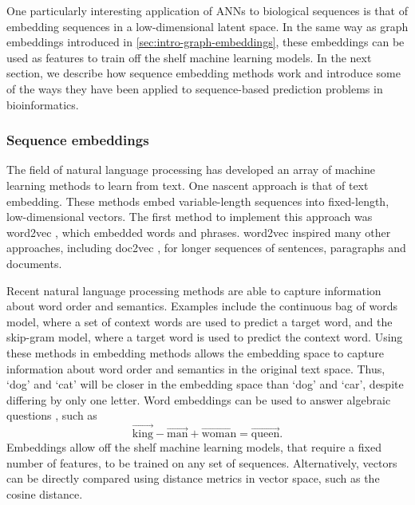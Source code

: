 One particularly interesting application of ANNs to biological sequences is that of embedding sequences in a low-dimensional latent space. In the same way as graph embeddings introduced in \ref{sec:intro-graph-embeddings}, these embeddings can be used as features to train off the shelf machine learning models. In the next section, we describe how sequence embedding methods work and introduce some of the ways they have been applied to sequence-based prediction problems in bioinformatics.

\subsubsection{Sequence embeddings}
\label{sec:intro-sequence-embeddings}

The field of natural language processing has developed an array of machine learning methods to learn from text. One nascent approach is that of text embedding. These methods embed variable-length sequences into fixed-length, low-dimensional vectors. The first method to implement this approach was word2vec \cite{Mikolov}, which embedded words and phrases. word2vec inspired many other approaches, including doc2vec \cite{Le2014}, for longer sequences of sentences, paragraphs and documents.

Recent natural language processing methods are able to capture information about word order and semantics. Examples include the continuous bag of words model, where a set of context words are used to predict a target word, and the skip-gram model, where a target word is used to predict the context word. Using these methods in embedding methods allows the embedding space to capture information about word order and semantics in the original text space. Thus, `dog' and `cat' will be closer in the embedding space than `dog' and `car', despite differing by only one letter. Word embeddings can be used to answer algebraic questions \cite{Le2014}, such as
\[
\overrightarrow{\text{king}} - \overrightarrow{\text{man}} + \overrightarrow{\text{woman}} = \overrightarrow{\text{queen}}.
\]
Embeddings allow off the shelf machine learning models, that require a fixed number of features, to be trained on any set of sequences. Alternatively, vectors can be directly compared using distance metrics in vector space, such as the cosine distance.

